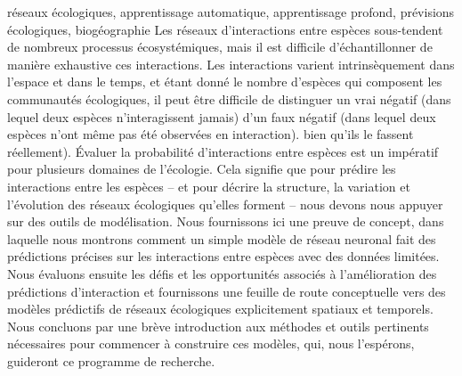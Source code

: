 \maketitle

\begin{resume}{réseaux écologiques, apprentissage automatique, apprentissage profond, prévisions écologiques, biogéographie}
  Les réseaux d’interactions entre espèces sous-tendent de nombreux processus écosystémiques, mais il est difficile d’échantillonner de manière exhaustive ces interactions. Les interactions varient intrinsèquement dans l'espace et dans le temps, et étant donné le nombre d'espèces qui composent les communautés écologiques, il peut être difficile de distinguer un vrai négatif (dans lequel deux espèces n'interagissent jamais) d'un faux négatif (dans lequel deux espèces n'ont même pas été observées en interaction). bien qu'ils le fassent réellement). Évaluer la probabilité d’interactions entre espèces est un impératif pour plusieurs domaines de l’écologie. Cela signifie que pour prédire les interactions entre les espèces – et pour décrire la structure, la variation et l’évolution des réseaux écologiques qu’elles forment – nous devons nous appuyer sur des outils de modélisation. Nous fournissons ici une preuve de concept, dans laquelle nous montrons comment un simple modèle de réseau neuronal fait des prédictions précises sur les interactions entre espèces avec des données limitées. Nous évaluons ensuite les défis et les opportunités associés à l’amélioration des prédictions d’interaction et fournissons une feuille de route conceptuelle vers des modèles prédictifs de réseaux écologiques explicitement spatiaux et temporels. Nous concluons par une brève introduction aux méthodes et outils pertinents nécessaires pour commencer à construire ces modèles, qui, nous l’espérons, guideront ce programme de recherche.
\end{resume}

